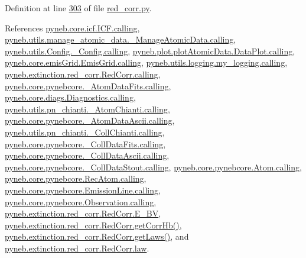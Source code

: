 \begin{DoxyVerb}
Definition at line \hyperlink{red__corr_8py_source_l00303}{303} of file \hyperlink{red__corr_8py_source}{red\-\_\-corr.\-py}.



References \hyperlink{icf_8py_source_l00016}{pyneb.\-core.\-icf.\-I\-C\-F.\-calling}, \hyperlink{manage__atomic__data_8py_source_l00018}{pyneb.\-utils.\-manage\-\_\-atomic\-\_\-data.\-\_\-\-Manage\-Atomic\-Data.\-calling}, \hyperlink{_config_8py_source_l00032}{pyneb.\-utils.\-Config.\-\_\-\-Config.\-calling}, \hyperlink{plot_atomic_data_8py_source_l00042}{pyneb.\-plot.\-plot\-Atomic\-Data.\-Data\-Plot.\-calling}, \hyperlink{emis_grid_8py_source_l00044}{pyneb.\-core.\-emis\-Grid.\-Emis\-Grid.\-calling}, \hyperlink{logging_8py_source_l00044}{pyneb.\-utils.\-logging.\-my\-\_\-logging.\-calling}, \hyperlink{red__corr_8py_source_l00059}{pyneb.\-extinction.\-red\-\_\-corr.\-Red\-Corr.\-calling}, \hyperlink{pynebcore_8py_source_l00097}{pyneb.\-core.\-pynebcore.\-\_\-\-Atom\-Data\-Fits.\-calling}, \hyperlink{diags_8py_source_l00169}{pyneb.\-core.\-diags.\-Diagnostics.\-calling}, \hyperlink{pn__chianti_8py_source_l00240}{pyneb.\-utils.\-pn\-\_\-chianti.\-\_\-\-Atom\-Chianti.\-calling}, \hyperlink{pynebcore_8py_source_l00318}{pyneb.\-core.\-pynebcore.\-\_\-\-Atom\-Data\-Ascii.\-calling}, \hyperlink{pn__chianti_8py_source_l00434}{pyneb.\-utils.\-pn\-\_\-chianti.\-\_\-\-Coll\-Chianti.\-calling}, \hyperlink{pynebcore_8py_source_l00585}{pyneb.\-core.\-pynebcore.\-\_\-\-Coll\-Data\-Fits.\-calling}, \hyperlink{pynebcore_8py_source_l00936}{pyneb.\-core.\-pynebcore.\-\_\-\-Coll\-Data\-Ascii.\-calling}, \hyperlink{pynebcore_8py_source_l01156}{pyneb.\-core.\-pynebcore.\-\_\-\-Coll\-Data\-Stout.\-calling}, \hyperlink{pynebcore_8py_source_l01229}{pyneb.\-core.\-pynebcore.\-Atom.\-calling}, \hyperlink{pynebcore_8py_source_l02643}{pyneb.\-core.\-pynebcore.\-Rec\-Atom.\-calling}, \hyperlink{pynebcore_8py_source_l03385}{pyneb.\-core.\-pynebcore.\-Emission\-Line.\-calling}, \hyperlink{pynebcore_8py_source_l03541}{pyneb.\-core.\-pynebcore.\-Observation.\-calling}, \hyperlink{red__corr_8py_source_l00203}{pyneb.\-extinction.\-red\-\_\-corr.\-Red\-Corr.\-E\-\_\-\-B\-V}, \hyperlink{red__corr_8py_source_l00240}{pyneb.\-extinction.\-red\-\_\-corr.\-Red\-Corr.\-get\-Corr\-Hb()}, \hyperlink{red__corr_8py_source_l00126}{pyneb.\-extinction.\-red\-\_\-corr.\-Red\-Corr.\-get\-Laws()}, and \hyperlink{red__corr_8py_source_l00205}{pyneb.\-extinction.\-red\-\_\-corr.\-Red\-Corr.\-law}.



\end{DoxyVerb}
